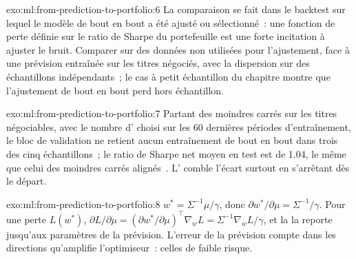 \begin{solution}{exo:ml:from-prediction-to-portfolio:6}
La comparaison se fait dans le backtest sur lequel le modèle de bout en bout a été ajusté ou sélectionné~: une fonction de perte définie sur le ratio de Sharpe du portefeuille
est une forte incitation à ajuster le bruit. Comparer sur des données non utilisées pour l'ajustement, face à une prévision entraînée sur les titres négociés, avec la dispersion
sur des échantillons indépendants~; le cas à petit échantillon du chapitre montre que l'ajustement de bout en bout perd hors échantillon.
\end{solution}

\begin{solution}{exo:ml:from-prediction-to-portfolio:7}
Partant des moindres carrés sur les titres négociables, avec le nombre d' choisi sur les 60 dernières périodes d'entraînement, le
bloc de validation ne retient aucun entraînement de bout en bout dans trois des cinq échantillons~; le ratio de Sharpe net moyen en test est de 1.04,
le même que celui des moindres carrés alignés~. L' comble l'écart surtout en s'arrêtant dès le départ.
\end{solution}

\begin{solution}{exo:ml:from-prediction-to-portfolio:8}
$w^* = \Sigma^{-1}\mu/\gamma$, donc $\partial w^*/\partial\mu = \Sigma^{-1}/\gamma$. Pour une perte $L(w^*)$, $\partial L/\partial\mu =
(\partial w^*/\partial\mu)^\top\nabla_wL = \Sigma^{-1}\nabla_wL/\gamma$, et la  la reporte jusqu'aux
paramètres de la prévision. L'erreur de la prévision compte dans les directions qu'amplifie l'optimiseur~: celles de faible risque.
\end{solution}

